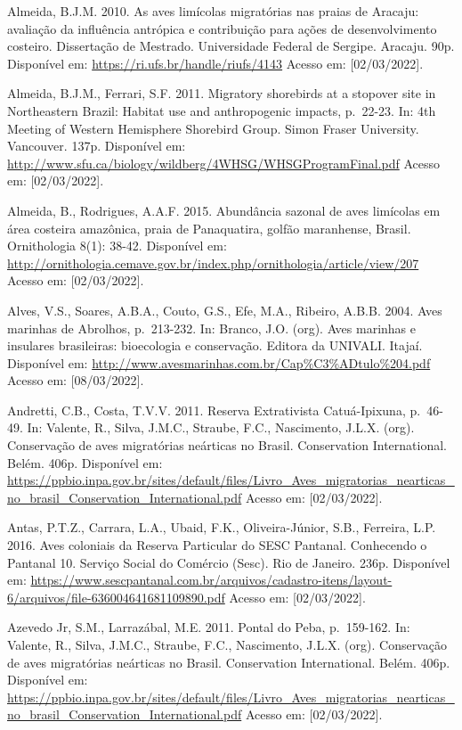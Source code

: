 \documentclass[
  oneside]{scrbook}
\begin{document}
Almeida, B.J.M. 2010. As aves limícolas migratórias nas praias de Aracaju: avaliação da influência antrópica e contribuição para ações de desenvolvimento costeiro. Dissertação de Mestrado. Universidade Federal de Sergipe. Aracaju. 90p. Disponível em: \url{https://ri.ufs.br/handle/riufs/4143} Acesso em: {[}02/03/2022{]}.

Almeida, B.J.M., Ferrari, S.F. 2011. Migratory shorebirds at a stopover site in Northeastern Brazil: Habitat use and anthropogenic impacts, p.~22-23. In: 4th Meeting of Western Hemisphere Shorebird Group. Simon Fraser University. Vancouver. 137p. Disponível em: \url{http://www.sfu.ca/biology/wildberg/4WHSG/WHSGProgramFinal.pdf} Acesso em: {[}02/03/2022{]}.

Almeida, B., Rodrigues, A.A.F. 2015. Abundância sazonal de aves limícolas em área costeira amazônica, praia de Panaquatira, golfão maranhense, Brasil. Ornithologia 8(1): 38-42. Disponível em: \url{http://ornithologia.cemave.gov.br/index.php/ornithologia/article/view/207} Acesso em: {[}02/03/2022{]}.

Alves, V.S., Soares, A.B.A., Couto, G.S., Efe, M.A., Ribeiro, A.B.B. 2004. Aves marinhas de Abrolhos, p.~213-232. In: Branco, J.O. (org). Aves marinhas e insulares brasileiras: bioecologia e conservação. Editora da UNIVALI. Itajaí. Disponível em: \url{http://www.avesmarinhas.com.br/Cap\%C3\%ADtulo\%204.pdf} Acesso em: {[}08/03/2022{]}.

Andretti, C.B., Costa, T.V.V. 2011. Reserva Extrativista Catuá-Ipixuna, p.~46-49. In: Valente, R., Silva, J.M.C., Straube, F.C., Nascimento, J.L.X. (org). Conservação de aves migratórias neárticas no Brasil. Conservation International. Belém. 406p. Disponível em: \url{https://ppbio.inpa.gov.br/sites/default/files/Livro_Aves_migratorias_nearticas_no_brasil_Conservation_International.pdf} Acesso em: {[}02/03/2022{]}.

Antas, P.T.Z., Carrara, L.A., Ubaid, F.K., Oliveira-Júnior, S.B., Ferreira, L.P. 2016. Aves coloniais da Reserva Particular do SESC Pantanal. Conhecendo o Pantanal 10. Serviço Social do Comércio (Sesc). Rio de Janeiro. 236p. Disponível em: \url{https://www.sescpantanal.com.br/arquivos/cadastro-itens/layout-6/arquivos/file-636004641681109890.pdf} Acesso em: {[}02/03/2022{]}.

Azevedo Jr, S.M., Larrazábal, M.E. 2011. Pontal do Peba, p.~159-162. In: Valente, R., Silva, J.M.C., Straube, F.C., Nascimento, J.L.X. (org). Conservação de aves migratórias neárticas no Brasil. Conservation International. Belém. 406p. Disponível em: \url{https://ppbio.inpa.gov.br/sites/default/files/Livro_Aves_migratorias_nearticas_no_brasil_Conservation_International.pdf} Acesso em: {[}02/03/2022{]}.
\end{document}
